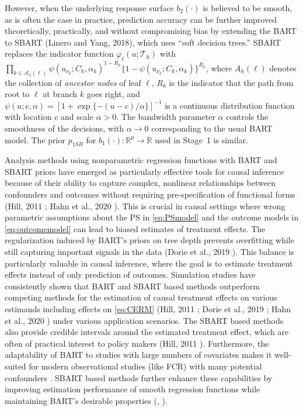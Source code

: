 \documentclass[aoas]{imsart}
\theoremstyle{plain}
\theoremstyle{definition}
\begin{document}
However, when the underlying response surface $b_2(\cdot)$ is believed to be smooth, as is often the case in practice, prediction accuracy can be further improved theoretically, practically, and without compromising bias by extending the BART to SBART (Linero and Yang, 2018), which uses ``soft decision trees.'' SBART replaces the indicator function $\varphi_\ell(u; \mathcal{T}_h)$ with $ \prod_{k \in \mathcal A_h(\ell)} \psi(u_{\nu_k} ; C_k, \alpha_k)^{1-R_k} \{1-\psi(u_{\nu_k}; C_k, \alpha_k)\}^{R_k}$, where $A_h(\ell)$ denotes the collection of \emph{ancestor nodes} of leaf $\ell$, $R_k$ is the indicator that the path from root to $\ell$ at branch $k$ goes right, and $\psi(u; c, \alpha)=[1 + \exp\{-(u - c) / \alpha\}]^{-1}$ is a continuous distribution function with location $c$ and scale $\alpha>0$. The bandwidth parameter $\alpha$ controls the smoothness of the decisions, with $\alpha \to 0$ corresponding to the usual BART model. The prior $p_{1SB}$ for $b_1(\cdot): \mathbb{R}^{p}\to \mathbb{R}$ used in Stage~1 is similar. 


Analysis methods using nonparametric regression functions with BART and SBART priors have emerged as particularly effective tools for causal inference because of their ability to capture complex, nonlinear relationships between confounders and outcomes without requiring pre-specification of functional forms (Hill, 2011 \parencite{hill2011bayesian}; Hahn et al., 2020 \parencite{hahn2020bayesian}). This is crucial in causal settings where wrong parametric assumptions about the PS in \eqref{eq:PSmodel} and the outcome models in \eqref{eq:outcomemodel} can lead to biased estimates of treatment effects. The regularization induced by BART's priors on tree depth prevents overfitting while still capturing important signals in the data (Dorie et al., 2019 \parencite{dorie2019automated}). 
This balance is particularly valuable in causal inference, where the goal is to estimate treatment effects instead of only prediction of outcomes. {Simulation studies have consistently shown that BART and SBART based methods outperform competing methods for the estimation of causal treatment effects on various estimands including effects on \eqref{eq:CERM}  (Hill, 2011 \parencite{hill2011bayesian}; Dorie et al., 2019 \parencite{dorie2019automated}; Hahn et al., 2020 \parencite{hahn2020bayesian}) under various application scenarios.} 
The SBART based methods also provide  credible intervals around the estimated treatment effect, which are often of practical interest to policy makers (Hill, 2011 \parencite{hill2011bayesian}). Furthermore, the adaptability of BART to studies with large numbers of covariates makes it well-suited for modern observational studies (like FCR) with many potential confounders \parencite{carnegie2019examining}. SBART based methods further enhance these capabilities by improving estimation performance of  smooth regression functions while maintaining BART's desirable properties (\parencite{Linero18},  \parencite{linero2023how}). 
\end{document}
